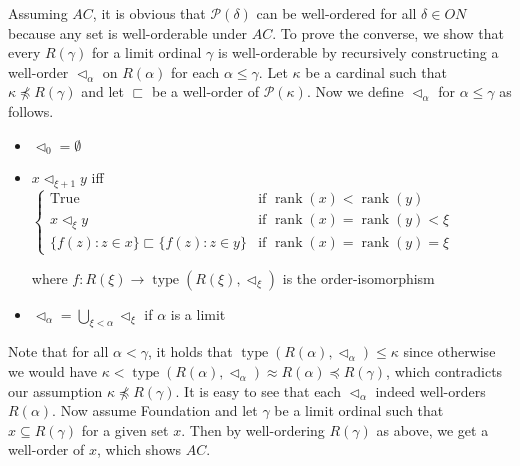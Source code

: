 \documentclass[12pt]{article}
\newcommand{\type}{\mathop{\mathrm{type}}}
\newcommand{\rank}{\mathop{\mathrm{rank}}}
\theoremstyle{definition}
\newenvironment{customthm}[1]
  {\renewcommand\theinnercustomthm{#1}\innercustomthm}
  {\endinnercustomthm}
\begin{document}
\begin{customthm}{I.12.17}
  Assuming $AC$, it is obvious that $\mathcal{P}(\delta)$ can be well-ordered for all $\delta\in ON$ because any set is well-orderable under $AC$. To prove the converse, we show that every $R(\gamma)$ for a limit ordinal $\gamma$ is well-orderable by recursively constructing a well-order $\triangleleft_\alpha$ on $R(\alpha)$ for each $\alpha\leq\gamma$. Let $\kappa$ be a cardinal such that $\kappa\not\preccurlyeq R(\gamma)$ and let $\sqsubset$ be a well-order of $\mathcal{P}(\kappa)$. Now we define $\triangleleft_\alpha$ for $\alpha\leq\gamma$ as follows.
  \begin{itemize}
    \item $\triangleleft_0=\emptyset$
    \item $x\triangleleft_{\xi+1}y$ iff
      $\begin{cases}
        \text{True} & \text{if }\rank(x)<\rank(y) \\
        x\triangleleft_\xi y & \text{if }\rank(x)=\rank(y)<\xi \\
        \{f(z):z\in x\}\sqsubset\{f(z):z\in y\} & \text{if }\rank(x)=\rank(y)=\xi
      \end{cases}$

      where $f:R(\xi)\rightarrow\type(R(\xi),\triangleleft_\xi)$ is the order-isomorphism
    \item $\triangleleft_\alpha=\bigcup_{\xi<\alpha}\triangleleft_\xi$ if $\alpha$ is a limit
  \end{itemize}
  Note that for all $\alpha<\gamma$, it holds that $\type(R(\alpha),\triangleleft_\alpha)\leq\kappa$ since otherwise we would have $\kappa<\type(R(\alpha),\triangleleft_\alpha)\approx R(\alpha)\preccurlyeq R(\gamma)$, which contradicts our assumption $\kappa\not\preccurlyeq R(\gamma)$. It is easy to see that each $\triangleleft_\alpha$ indeed well-orders $R(\alpha)$. Now assume Foundation and let $\gamma$ be a limit ordinal such that $x\subseteq R(\gamma)$ for a given set $x$. Then by well-ordering $R(\gamma)$ as above, we get a well-order of $x$, which shows $AC$.
\end{customthm}
\end{document}
